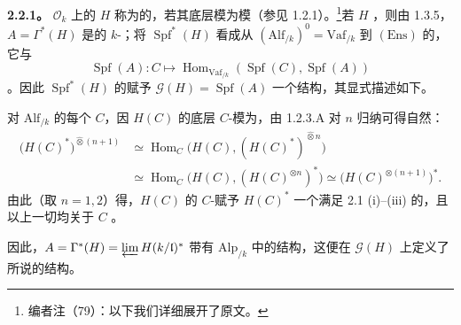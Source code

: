 \textbf{2.2.1。} $\mathscr O_k$ 上的 $H$ 称为的，若其底层模为模（参见 1.2.1）。\footnote{编者注（79）：以下我们详细展开了原文。}若 $H$ ，则由 1.3.5，$A=\Gamma^*(H)$ 是的 $k$-；将 $\operatorname{Spf}^*(H)$ 看成从 $(\mathrm{Alf}_{/k})^0=\mathrm{Vaf}_{/k}$ 到 $(\mathrm{Ens})$ 的，它与
\[
\operatorname{Spf}(A):C\longmapsto\operatorname{Hom}_{\mathrm{Vaf}_{/k}}(\operatorname{Spf}(C),\operatorname{Spf}(A))
\]
。因此 $\operatorname{Spf}^*(H)$ 的赋予 $\mathscr G(H)=\operatorname{Spf}(A)$ 一个结构，其显式描述如下。

对 $\mathrm{Alf}_{/k}$ 的每个 $C$，因 $H(C)$ 的底层 $C$-模为，由 1.2.3.A 对 $n$ 归纳可得自然：
\[
\begin{aligned}
\bigl(H(C)^*\bigr)^{\widehat\otimes(n+1)}
&\simeq\operatorname{Hom}_C\bigl(H(C),(H(C)^*)^{\widehat\otimes n}\bigr)\\
&\simeq\operatorname{Hom}_C\bigl(H(C),(H(C)^{\otimes n})^*\bigr)
\simeq\bigl(H(C)^{\otimes(n+1)}\bigr)^*.
\end{aligned}
\]
由此（取 $n=1,2$）得，$H(C)$ 的 $C$-赋予 $H(C)^*$ 一个满足 2.1 (i)--(iii) 的，且以上一切均关于 $C$ 。

因此，$A=\Gamma^*(H)=\varprojlim H(k/\mathfrak l)^*$ 带有 $\mathrm{Alp}_{/k}$ 中的结构，这便在 $\mathscr G(H)$ 上定义了所说的结构。

